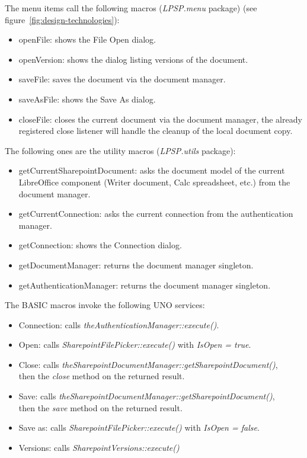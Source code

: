 The menu items call the following macros (\emph{LPSP.menu} package) (see figure~\ref{fig:design-technologies}):

\begin{itemize}
\item openFile: shows the File Open dialog.
\item openVersion: shows the dialog listing versions of the document.
\item saveFile: saves the document via the document manager.
\item saveAsFile: shows the Save As dialog.
\item closeFile: closes the current document via the document manager, the
already registered close listener will handle the cleanup of the local document
copy.
\end{itemize}

The following ones are the utility macros (\emph{LPSP.utils} package):

\begin{itemize}
\item getCurrentSharepointDocument: asks the document model of the current LibreOffice component (Writer document, Calc spreadsheet, etc.) from the document manager.
\item getCurrentConnection: asks the current connection from the authentication manager.
\item getConnection: shows the Connection dialog.
\item getDocumentManager: returns the document manager singleton.
\item getAuthenticationManager: returns the document manager singleton.
\end{itemize}

The BASIC macros invoke the following UNO services:

\begin{itemize}
\item Connection: calls \emph{theAuthenticationManager::execute()}.
\item Open: calls \emph{SharepointFilePicker::execute()} with \emph{IsOpen = true}.
\item Close: calls \emph{theSharepointDocumentManager::getSharepointDocument()}, \\ then the \emph{close} method on the returned result.
\item Save: calls \emph{theSharepointDocumentManager::getSharepointDocument()}, \\ then the \emph{save} method on the returned result.
\item Save as: calls \emph{SharepointFilePicker::execute()} with \emph{IsOpen = false}.
\item Versions: calls \emph{SharepointVersions::execute()}
\end{itemize}

